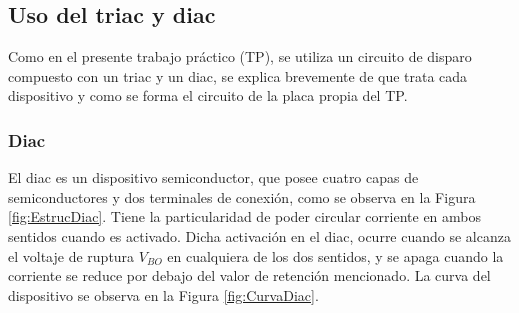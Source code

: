 \subsection{Uso del triac y diac}
    Como en el presente trabajo práctico (TP), se utiliza un circuito de
    disparo compuesto con un triac y un diac, se explica brevemente
    de que trata cada dispositivo y como se forma el circuito de la placa
    propia del TP.
    
    \subsubsection{Diac}
        El diac es un dispositivo semiconductor, que posee cuatro capas de semiconductores  
        y dos terminales de conexión, como se observa en la Figura \ref{fig:EstrucDiac}. 
        Tiene la particularidad de poder circular corriente en ambos sentidos cuando es 
        activado. Dicha activación en el diac, ocurre cuando se alcanza el voltaje de ruptura 
        \(V_{BO}\) en cualquiera de los dos sentidos, y se apaga cuando la corriente se 
        reduce por debajo del valor de retención mencionado. 
        La curva del dispositivo se observa en la Figura \ref{fig:CurvaDiac}. 

